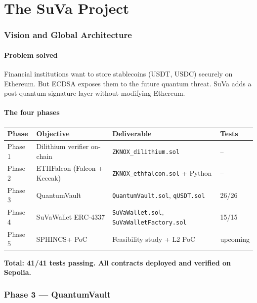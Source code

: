 \documentclass[11pt,a4paper]{article}
\begin{document}
\newpage
\part{The SuVa Project}

\section{Vision and Global Architecture}

\subsection{Problem solved}

Financial institutions want to store stablecoins (USDT, USDC) securely on Ethereum. But ECDSA exposes them to the future quantum threat. SuVa adds a post-quantum signature layer without modifying Ethereum.

\subsection{The four phases}

\begin{longtable}{@{}p{1.8cm}p{4cm}p{4cm}p{4cm}@{}}
\toprule
\textbf{Phase} & \textbf{Objective} & \textbf{Deliverable} & \textbf{Tests} \\
\midrule
\endhead
Phase 1 & Dilithium verifier on-chain & \texttt{ZKNOX\_dilithium.sol} & -- \\[4pt]
Phase 2 & ETHFalcon (Falcon + Keccak) & \texttt{ZKNOX\_ethfalcon.sol} + Python & -- \\[4pt]
Phase 3 & QuantumVault & \texttt{QuantumVault.sol}, \texttt{qUSDT.sol} & 26/26 \\[4pt]
Phase 4 & SuVaWallet ERC-4337 & \texttt{SuVaWallet.sol}, \texttt{SuVaWalletFactory.sol} & 15/15 \\[4pt]
Phase 5 & SPHINCS+ PoC & Feasibility study + L2 PoC & upcoming \\
\bottomrule
\end{longtable}

\textbf{Total: 41/41 tests passing. All contracts deployed and verified on Sepolia.}

\section{Phase 3 --- QuantumVault}
\end{document}
